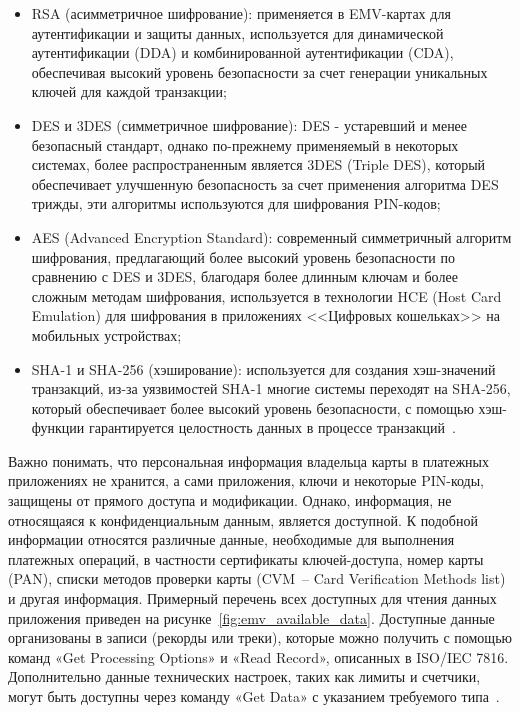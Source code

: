 \begin{itemize}
    \item RSA (асимметричное шифрование): применяется в EMV-картах для аутентификации и защиты данных, используется для динамической аутентификации (DDA) и комбинированной аутентификации (CDA), обеспечивая высокий уровень безопасности за счет генерации уникальных ключей для каждой транзакции;
    \item DES и 3DES (симметричное шифрование): DES - устаревший и менее безопасный стандарт, однако по-прежнему применяемый в некоторых системах, более распространенным является 3DES (Triple DES), который обеспечивает улучшенную безопасность за счет применения алгоритма DES трижды, эти алгоритмы используются для шифрования PIN-кодов;
    \item AES (Advanced Encryption Standard): современный симметричный алгоритм шифрования, предлагающий более высокий уровень безопасности по сравнению с DES и 3DES, благодаря более длинным ключам и более сложным методам шифрования, используется в технологии HCE (Host Card Emulation) для шифрования в приложениях <<Цифровых кошельках>> на мобильных устройствах;
    \item SHA-1 и SHA-256 (хэширование): используется для создания хэш-значений транзакций, из-за уязвимостей SHA-1 многие системы переходят на SHA-256, который обеспечивает более высокий уровень безопасности, с помощью хэш-функции гарантируется целостность данных в процессе транзакций~\cite{emv_fastercapital}.
\end{itemize}

Важно понимать, что персональная информация владельца карты в платежных приложениях не хранится, а сами приложения, ключи и некоторые PIN-коды, защищены от прямого доступа и модификации.
Однако, информация, не относящаяся к конфиденциальным данным, является доступной.
К подобной информации относятся различные данные, необходимые для выполнения платежных операций, в частности сертификаты ключей-доступа, номер карты (PAN), списки методов проверки карты (CVM~-- Card Verification Methods list) и другая информация.
Примерный перечень всех доступных для чтения данных приложения приведен на рисунке~\ref{fig:emv_available_data}.
Доступные данные организованы в записи (рекорды или треки), которые можно получить с помощью команд «Get Processing Options» и «Read Record», описанных  в ISO/IEC 7816.
Дополнительно данные технических настроек, таких как лимиты и счетчики, могут быть доступны через команду «Get Data» с указанием требуемого типа~\cite{emv_card_mechanism}.

